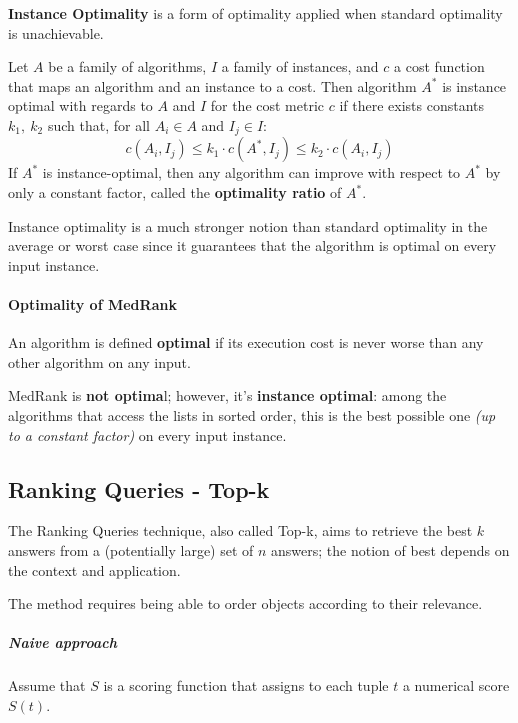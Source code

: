 \documentclass[english]{article}
\begin{document}
\textbf{Instance Optimality} is a form of optimality applied when standard optimality is unachievable.

Let \(A\) be a family of algorithms, \(I\) a family of instances, and \(c\) a cost function that maps an algorithm and an instance to a cost.
Then algorithm \(A^\ast\) is instance optimal with regards to \(A\) and \(I\) for the cost metric \(c\) if there exists constants \(k_1, \ k_2\) such that, for all \(A_i \in A\) and \(I_j \in I\):
\[ c\left( A_i, I_j \right) \leq k_1 \cdot c\left( A^\ast, I_j \right) \leq k_2 \cdot c\left( A_i, I_j \right) \]
If \(A^\ast\) is instance-optimal, then any algorithm can improve with respect to \(A^\ast\) by only a constant factor, called the \textbf{optimality ratio} of \(A^\ast\).

Instance optimality is a much stronger notion than standard optimality in the average or worst case since it guarantees that the algorithm is optimal on every input instance.

\paragraph{Optimality of MedRank}

An algorithm is defined \textbf{optimal} if its execution cost is never worse than any other algorithm on any input.

MedRank is \textbf{not optima}l;
however, it's \textbf{instance optimal}:
among the algorithms that access the lists in sorted order, this is the best possible one \textit{(up to a constant factor)} on every input instance.

\subsection{Ranking Queries - Top-k}

The Ranking Queries technique, also called Top-k, aims to retrieve the best \(k\) answers from a (potentially large) set of \(n\) answers;
the notion of best depends on the context and application.

The method requires being able to order objects according to their relevance.

\subparagraph*{Naive approach}
Assume that \(S\) is a scoring function that assigns to each tuple \(t\) a numerical score \(S(t)\).
\end{document}
